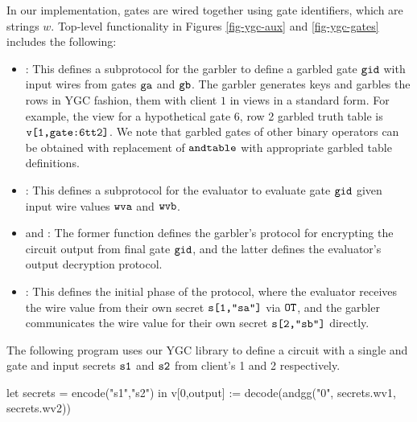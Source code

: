 In our implementation, gates are wired together using gate
identifiers, which are strings $w$. Top-level functionality in Figures
\ref{fig-ygc-aux} and \ref{fig-ygc-gates} includes the following:
\begin{itemize}
\item {}: This defines a subprotocol for the garbler
  to define a garbled gate $\texttt{gid}$ with input wires from gates
  $\texttt{ga}$ and $\texttt{gb}$. The garbler generates keys and garbles
  the rows in YGC fashion, them with client $1$ in
  views in a standard form. For example, the view for
  a hypothetical gate 6, row 2 garbled truth table is $\texttt{v[1,gate:6tt2]}$.
  We note that garbled gates of other binary operators can be obtained with
  replacement of $\texttt{andtable}$ with appropriate garbled table definitions. 
\item {}: This defines a subprotocol for the evaluator to
  evaluate gate $\texttt{gid}$ given input wire values $\texttt{wva}$ and
  $\texttt{wvb}$.
\item {} and : The former function
  defines the garbler's protocol for encrypting the circuit
  output from final gate $\texttt{gid}$, and the latter defines
  the evaluator's output decryption protocol.
\item {}: This defines the initial phase of the protocol,
  where the evaluator receives the wire value from their own
  secret $\texttt{s[1,"sa"]}$ via $\texttt{OT}$, and the garbler communicates
  the wire value for their own secret $\texttt{s[2,"sb"]}$ directly.
\end{itemize}
\begin{example}
  \label{example-ygc-andcircuit}
The following program uses our YGC library to define
a circuit with a single and gate and input secrets $\texttt{s1}$ and
$\texttt{s2}$ from client's 1 and 2 respectively. 
{\footnotesize
\begin{verbatimtab}
  let secrets = encode("s1","s2") in v[0,output] := decode(andgg("0", secrets.wv1, secrets.wv2)) \end{verbatimtab}
}
\end{example}
